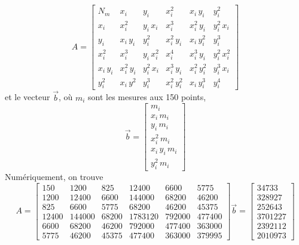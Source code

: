 \documentclass[main.tex]{subfiles}
\begin{document}
\begin{equation}
    A=
    \begin{bmatrix}
        N_m      & x_i        & y_i        & x_i^2        & x_i\,y_i     & y_i^2        \\
        x_i      & x_i^2      & y_i\,x_i   & x_i^3        & x_i^2\,y_i   & y_i^2\,x_i   \\
        y_i      & x_i\,y_i   & y_i^2      & x_i^2\,y_i   & x_i\,y_i^2   & y_i^3        \\
        x_i^2    & x_i^3      & y_i\,x_i^2 & x_i^4        & x_i^3\,y_i   & y_i^2\,x_i^2 \\
        x_i\,y_i & x_i^2\,y_i & y_i^2\,x_i & x_i^3\,y_i   & x_i^2\,y_i^2 & y_i^3\,x_i   \\
        y_i^2    & x_i\,y^2   & y_i^3      & x_i^2\,y_i^2 & x_i\,y_i^3   & y_i^4
    \end{bmatrix}
\end{equation}
et le vecteur $\vec{b}$, où $m_i$ sont les mesures aux 150 points,
\begin{equation}
    \vec{b}=
    \begin{bmatrix}
        m_i           \\
        x_i\,m_i      \\
        y_i\,m_i      \\
        x_i^2\,m_i    \\
        x_i\,y_i\,m_i \\
        y_i^2\,m_i
    \end{bmatrix}
\end{equation}
Numériquement, on trouve
\begin{equation}
    A=
    \begin{bmatrix}
        150   & 1200   & 825   & 12400   & 6600   & 5775   \\
        1200  & 12400  & 6600  & 144000  & 68200  & 46200  \\
        825   & 6600   & 5775  & 68200   & 46200  & 45375  \\
        12400 & 144000 & 68200 & 1783120 & 792000 & 477400 \\
        6600  & 68200  & 46200 & 792000  & 477400 & 363000 \\
        5775  & 46200  & 45375 & 477400  & 363000 & 379995
    \end{bmatrix}
    \vec{b}=
    \begin{bmatrix}
        34733   \\
        328927  \\
        252643  \\
        3701227 \\
        2392112 \\
        2010973
    \end{bmatrix}
\end{equation}
\end{document}

